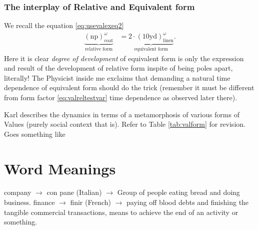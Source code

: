 \documentclass[12pt]{extarticle}
\theoremstyle{definition}
\begin{document}
 \subsubsection{The interplay of Relative and Equivalent form}
  We recall the equation \ref{eq:usevalexeq2}
  \begin{align}
  \underbrace{(\text{np})_{\text{coat}}^{\omega}}_{\text{relative form}} &= \underbrace{2\cdot (10\text{yd})_{\text{linen}}^{\omega}}_{\text{equivalent form}}.
  \end{align}
  Here it is clear \emph{degree of development} of equivalent form is only the expression and result of the development of relative form inspite of being poles apart, literally!  The Physicist inside me exclaims that demanding a natural time dependence of equivalent form should do the trick (remember it must be different from form factor \ref{eq:valreltestvar} time dependence as observed later there).

  Karl describes the dynamics in terms of a metamorphosis of various forms of Values (purely social context that is).  Refer to Table \ref{tab:valform} for revision.  Goes something like 





\appendix

\section{Word Meanings}
company $\rightarrow$ con pane (Italian) $\rightarrow$ Group of people eating bread and doing business.\newline
finance $\rightarrow$ finir (French) $\rightarrow$ paying off blood debts and finishing the tangible commercial transactions, means to achieve the end of an activity or something.
\end{document}
